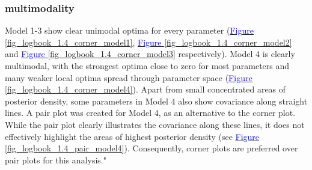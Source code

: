 \subsubsection{multimodality}
Model 1-3 show clear unimodal optima for every parameter (\hyperref[fig_logbook_1.4_corner_model1]{\textcolor{blue}{Figure }\ref{fig_logbook_1.4_corner_model1}}, \hyperref[fig_logbook_1.4_corner_model2]{\textcolor{blue}{Figure }\ref{fig_logbook_1.4_corner_model2}} and \hyperref[fig_logbook_1.4_corner_model3]{\textcolor{blue}{Figure }\ref{fig_logbook_1.4_corner_model3}} respectively). Model 4 is clearly multimodal, with the strongest optima close to zero for most parameters and many weaker local optima spread through parameter space (\hyperref[fig_logbook_1.4_corner_model4]{\textcolor{blue}{Figure }\ref{fig_logbook_1.4_corner_model4}}). Apart from small concentrated areas of posterior density, some parameters in Model 4 also show covariance along straight lines. A pair plot was created for Model 4, as an alternative to the corner plot. While the pair plot clearly illustrates the covariance along these lines, it does not effectively highlight the areas of highest posterior density (see \hyperref[fig_logbook_1.4_pair_model4]{\textcolor{blue}{Figure }\ref{fig_logbook_1.4_pair_model4}}). Consequently, corner plots are preferred over pair plots for this analysis."


